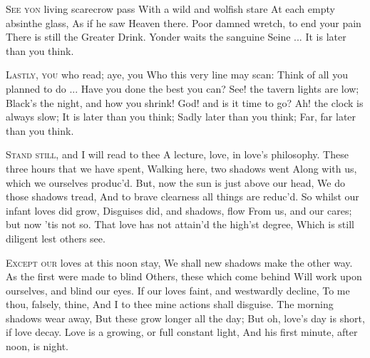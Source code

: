 \documentclass[fontsize=9, a5paper]{scrbook}
\newcommand\blankpage{%
    \null
    \thispagestyle{empty}%
    \addtocounter{page}{-1}%
    \newpage}
\begin{document}
\begin{poem}
	\begin{stanza}
		\textsc{See yon} living scarecrow pass\verseline
		With a wild and wolfish stare\verseline
		At each empty absinthe glass,\verseline
		As if he saw Heaven there.\verseline
		Poor damned wretch, to end your pain\verseline
		There is still the Greater Drink.\verseline
		Yonder waits the sanguine Seine ...\verseline
		It is later than you think.
	\end{stanza}
	
	\begin{stanza}
		\textsc{Lastly, you} who read; aye, you\verseline
		Who this very line may scan:\verseline
		Think of all you planned to do ...   \verseline
		Have you done the best you can?\verseline
		See! the tavern lights are low;\verseline
		Black’s the night, and how you shrink!\verseline
		God! and is it time to go?\verseline
		Ah! the clock is always slow;\verseline
		It is later than you think;\verseline
		Sadly later than you think;\verseline
		Far, far later than you think.
	\end{stanza}
\end{poem}

\pagebreak

\afterpage{\blankpage}
\begin{poem}
	\begin{stanza}
		\textsc{Stand still,} and I will read to thee\verseline
		A lecture, love, in love's philosophy.\verseline
		         \verseindent These three hours that we have spent,\verseline
		         \verseindent Walking here, two shadows went\verseline
		Along with us, which we ourselves produc'd.\verseline
		But, now the sun is just above our head,\verseline
		         \verseindent We do those shadows tread,\verseline
		         \verseindent And to brave clearness all things are reduc'd.\verseline
		So whilst our infant loves did grow,\verseline
		Disguises did, and shadows, flow\verseline
		From us, and our cares; but now 'tis not so.\verseline
		That love has not attain'd the high'st degree,\verseline
		Which is still diligent lest others see.
	\end{stanza}
	
	\begin{stanza}
		\textsc{Except our} loves at this noon stay,\verseline
		We shall new shadows make the other way.\verseline
		         \verseindent As the first were made to blind\verseline
		         \verseindent Others, these which come behind\verseline
		Will work upon ourselves, and blind our eyes.\verseline
		If our loves faint, and westwardly decline,\verseline
		         \verseindent To me thou, falsely, thine,\verseline
		         \verseindent And I to thee mine actions shall disguise.\verseline
		The morning shadows wear away,\verseline
		But these grow longer all the day;\verseline
		But oh, love's day is short, if love decay.\verseline
		Love is a growing, or full constant light,\verseline
		And his first minute, after noon, is night.
	\end{stanza}
\end{poem}
\end{document}
